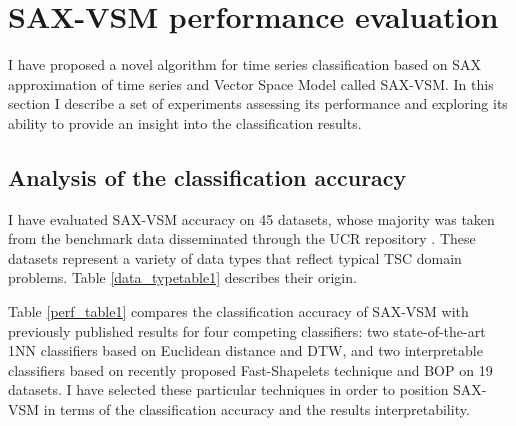 \section{SAX-VSM performance evaluation} \label{results}
I have proposed a novel algorithm for time series classification based on SAX approximation of time series and 
Vector Space Model called SAX-VSM. In this section I describe a set of experiments assessing its performance and 
exploring its ability to provide an insight into the classification results.

\subsection{Analysis of the classification accuracy}
I have evaluated SAX-VSM accuracy on 45 datasets, whose majority was taken from the benchmark data disseminated 
through the UCR repository \cite{ucr}. These datasets represent a variety of data types that reflect typical TSC 
domain problems. Table \ref{data_typetable1} describes their origin.

Table \ref{perf_table1} compares the classification accuracy of \mbox{SAX-VSM} with 
previously published results for four competing classifiers: 
two state-of-the-art 1NN classifiers based on Euclidean distance and DTW, 
and two interpretable classifiers based on recently proposed Fast-Shapelets technique \cite{citeulike:12563493} 
and BOP \cite{citeulike:10525778} on 19 datasets.
I have selected these particular techniques in order to position \mbox{SAX-VSM} in terms of 
the classification accuracy and the results interpretability. 

